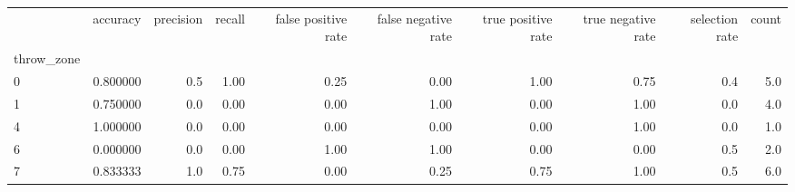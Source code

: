 \begin{tabular}{lrrrrrrrrr}
\toprule
{} &  accuracy &  precision &  recall &  false positive rate &  false negative rate &  true positive rate &  true negative rate &  selection rate &  count \\
throw\_zone &           &            &         &                      &                      &                     &                     &                 &        \\
\midrule
0          &  0.800000 &        0.5 &    1.00 &                 0.25 &                 0.00 &                1.00 &                0.75 &             0.4 &    5.0 \\
1          &  0.750000 &        0.0 &    0.00 &                 0.00 &                 1.00 &                0.00 &                1.00 &             0.0 &    4.0 \\
4          &  1.000000 &        0.0 &    0.00 &                 0.00 &                 0.00 &                0.00 &                1.00 &             0.0 &    1.0 \\
6          &  0.000000 &        0.0 &    0.00 &                 1.00 &                 1.00 &                0.00 &                0.00 &             0.5 &    2.0 \\
7          &  0.833333 &        1.0 &    0.75 &                 0.00 &                 0.25 &                0.75 &                1.00 &             0.5 &    6.0 \\
\bottomrule
\end{tabular}
